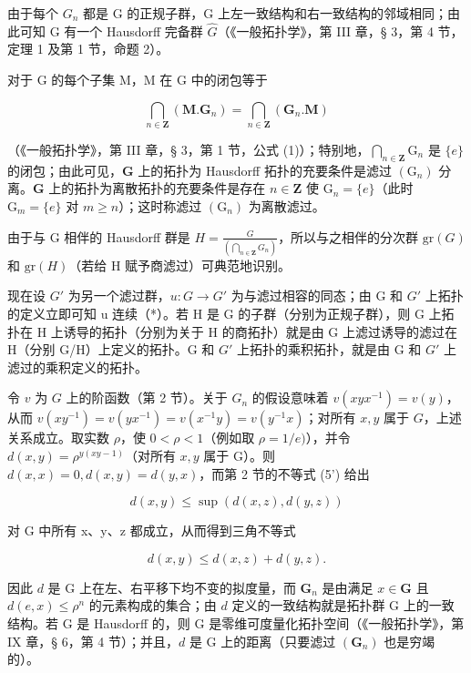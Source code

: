 由于每个 \(G_{n}\) 都是 G 的正规子群，G 上左一致结构和右一致结构的邻域相同；由此可知 G 有一个 Hausdorff 完备群 \(\hat{G}\)（《一般拓扑学》，第 III 章，§ 3，第 4 节，定理 1 及第 1 节，命题 2）。

对于 G 的每个子集 M，M 在 G 中的闭包等于

\[
\bigcap_ {n \in \mathbf {Z}} (\mathbf {M}. \mathbf {G} _ {n}) = \bigcap_ {n \in \mathbf {Z}} (\mathbf {G} _ {n}. \mathbf {M})
\]

	（《一般拓扑学》，第 III 章，§ 3，第 1 节，公式 (1)）；特别地，\(\bigcap_{n\in\mathbf{Z}}\mathrm{G}_{n}\) 是 \(\{e\}\) 的闭包；由此可见，\(\mathbf{G}\) 上的拓扑为 Hausdorff 拓扑的充要条件是滤过 \((\mathrm{G}_{n})\) 分离。\(\mathbf{G}\) 上的拓扑为离散拓扑的充要条件是存在 \(n\in\mathbf{Z}\) 使 \(\mathrm{G}_{n}=\{e\}\)（此时 \(\mathrm{G}_{m}=\{e\}\) 对 \(m\geqslant n\)）；这时称滤过 \((\mathrm{G}_{n})\) 为离散滤过。

由于与 G 相伴的 Hausdorff 群是 \(H = \frac{G}{\left(\bigcap_{n \in \mathbf{Z}} G_n\right)}\)，所以与之相伴的分次群 \(\text{gr}(G)\) 和 \(\text{gr}(H)\)（若给 H 赋予商滤过）可典范地识别。

现在设 \(G'\) 为另一个滤过群，\(u: G \to G'\) 为与滤过相容的同态；由 G 和 \(G'\) 上拓扑的定义立即可知 u 连续（*）。若 H 是 G 的子群（分别为正规子群），则 G 上拓扑在 H 上诱导的拓扑（分别为关于 H 的商拓扑）就是由 G 上滤过诱导的滤过在 H（分别 G/H）上定义的拓扑。G 和 \(G'\) 上拓扑的乘积拓扑，就是由 G 和 \(G'\) 上滤过的乘积定义的拓扑。

	令 \(v\) 为 \(G\) 上的阶函数（第 2 节）。关于 \(G_n\) 的假设意味着 \(v(xyx^{-1}) = v(y)\)，从而 \(v(xy^{-1}) = v(yx^{-1}) = v(x^{-1}y) = v(y^{-1}x)\)；对所有 \(x, y\) 属于 \(G\)，上述关系成立。取实数 \(\rho\)，使 \(0 < \rho < 1\)（例如取 \(\rho = 1 / e)\)），并令 \(d(x,y) = \rho^{y(xy - 1)}\)（对所有 \(x,y\) 属于 G）。则 \(d(x,x) = 0, d(x,y) = d(y,x)\)，而第 2 节的不等式 (5') 给出

\[
d (x, y) \leqslant \sup (d (x, z), d (y, z))\tag{15}
\]

对 G 中所有 x、y、z 都成立，从而得到三角不等式

\[
d (x, y) \leqslant d (x, z) + d (y, z).
\]

	因此 \(d\) 是 G 上在左、右平移下均不变的拟度量，而 \(\mathbf{G}_n\) 是由满足 \(x \in \mathbf{G}\) 且 \(d(e, x) \leqslant \rho^n\) 的元素构成的集合；由 \(d\) 定义的一致结构就是拓扑群 G 上的一致结构。若 G 是 Hausdorff 的，则 G 是零维可度量化拓扑空间（《一般拓扑学》，第 IX 章，§ 6，第 4 节）；并且，\(d\) 是 G 上的距离（只要滤过 \((\mathbf{G}_n)\) 也是穷竭的）。

